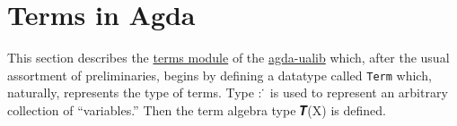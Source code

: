 \documentclass[sigplan,screen]{acmart}
\newcommand\ab[1]{\AgdaBound{#1}}
\newcommand\termsmodule{\href{https://gitlab.com/ualib/ualib.gitlab.io/-/blob/master/terms.lagda.rst}{terms module}\xspace}
\newcommand{\agdaualib}{\href{https://ualib.org}{agda-ualib}\xspace}
\newcommand{\agdaualib}{\href{anonymizedLink/agda-ualib.html}{agda-ualib}\xspace}
\newcommand\termsmodule{\href{anonymizedLink/terms.lagda.rst}{terms module}\xspace}
\begin{document}

\section{Terms in Agda}\label{terms-in-agda}
This section describes the \termsmodule of the \agdaualib which, after the usual assortment of preliminaries, begins by defining
a datatype called \texttt{Term} which, naturally, represents the type of terms. Type \ab 𝑋 : \ab 𝒰 ̇ is used to represent an arbitrary collection of ``variables.'' Then the term algebra type 𝑻(X) is defined.
\begin{code}\end{code}
\begin{code}\end{code}
\end{document}
